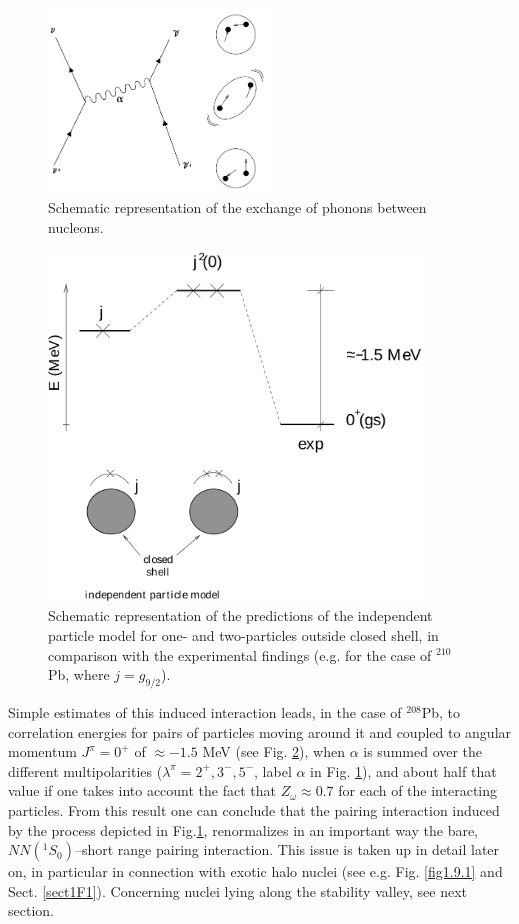 \begin{figure}
\centerline {
\includegraphics*[width=6cm]{introduccion/figs/figintroD9}
}
\caption{Schematic representation of the exchange of phonons between nucleons.}
\label{fig:4.9}
\end{figure}
\begin{figure}
\centerline {
\includegraphics*[width=10cm]{introduccion/figs/figintroD10}
}
\caption{Schematic representation of the predictions of the independent particle model for one- and two-particles outside closed shell, in comparison with the experimental findings (e.g. for the case of $^{210}$Pb, where $j=g_{9/2}$).}
\label{fig:4.10}
\end{figure}
Simple estimates of this induced interaction leads, in the case of $^{208}$Pb, to correlation energies  for pairs of particles moving around it and coupled to angular momentum $J^{\pi} = 0^+$ of $\approx -1.5$ MeV (see Fig. \ref{fig:4.10}), when $\alpha$ is summed over  the different multipolarities  ($\lambda^{\pi}=2^+,3^-,5^-$, label $\alpha$ in Fig. \ref{fig:4.9}), and about half that value if one takes into account the fact that $Z_\omega\approx0.7$ for each of the interacting particles. From this result one can conclude that the pairing interaction induced by the process depicted in Fig.\ref{fig:4.9}, renormalizes in an important way the bare, $NN(^1S_0)$--short range pairing interaction. This issue is taken up in detail later on, in particular in connection with exotic halo nuclei (see e.g. Fig. \ref{fig1.9.1} and Sect. \ref{sect1F1}). Concerning nuclei lying along the stability valley, see next section.

